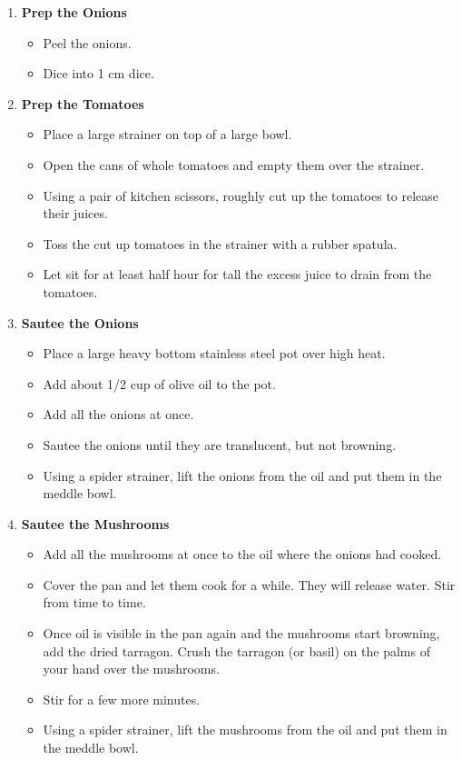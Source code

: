 \documentclass [11pt, letterpaper] {article}
\begin{document}
\begin{description}
\begin{enumerate}
	\item {\bf Prep the Onions}
	\begin{itemize}
		\item Peel the onions.
		\item Dice into 1 cm dice.
	\end{itemize}
	\item {\bf Prep the Tomatoes}
		\begin{itemize}
		\item Place a large strainer on top of a large bowl.
		\item Open the cans of whole tomatoes and empty them over the strainer.
		\item Using a pair of kitchen scissors, roughly cut up the tomatoes to release their juices.
		\item Toss the cut up tomatoes in the strainer with a rubber spatula.
		\item Let sit for at least half hour for tall the excess juice to drain from the tomatoes.
	\end{itemize}
	\item {\bf Sautee the Onions}
	        \begin{itemize}
	        \item Place a large heavy bottom stainless steel pot over high heat.
	        \item Add about 1/2 cup of olive oil to the pot.
	        \item Add all the onions at once.
	        \item Sautee the onions until they are translucent, but not browning.
	        \item Using a spider strainer, lift the onions from the oil and put them in the meddle bowl.
	        \end{itemize}
	\item {\bf Sautee the Mushrooms}
		\begin{itemize}
		\item Add all the mushrooms at once to the oil where the onions had cooked.
		\item Cover the pan and let them cook for a while. They will release water. Stir from time to time.
		\item Once oil is visible in the pan again and the mushrooms start browning, add the dried tarragon. Crush the tarragon (or basil) on the palms of your hand over the mushrooms.
		\item Stir for a few more minutes.
		\item Using a spider strainer, lift the mushrooms from the oil and put them in the meddle bowl.

\end{itemize}
\end{enumerate}
\end{description}
\end{document}
